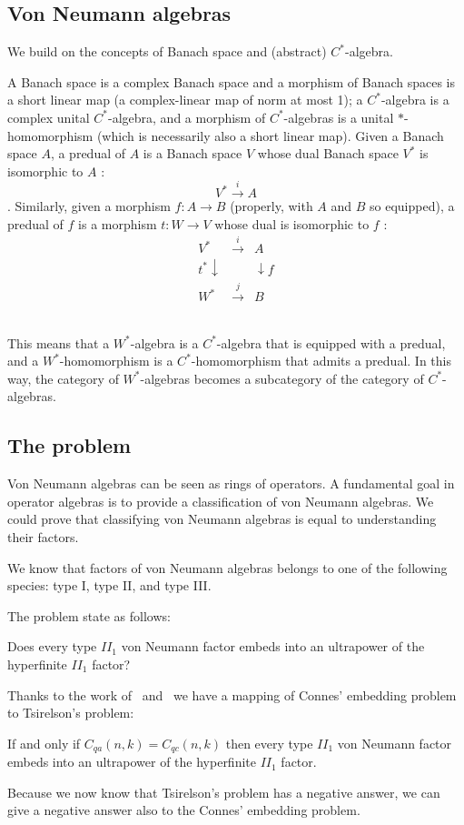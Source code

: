 
\subsection{Von Neumann algebras}
We build on the concepts of Banach space and (abstract) $C^{*}$-algebra. 

\begin{defn}
A Banach space is a complex Banach space and a morphism of Banach spaces is a short linear map (a complex-linear map of norm at most 1); a $C^{*}$-algebra is a complex unital $C^{*}$-algebra, and a morphism of $C^{*}$-algebras is a unital $*$-homomorphism (which is necessarily also a short linear map).
Given a Banach space $A$, a predual of $A$ is a Banach space $V$ whose dual Banach space $V^{*}$ is isomorphic to $A$ :
$$
V^{*} \stackrel{i}{\rightarrow} A
$$
. Similarly, given a morphism $f: A \rightarrow B$ (properly, with $A$ and $B$ so equipped), a predual of $f$ is a morphism $t: W \rightarrow V$ whose dual is isomorphic to $f$ :
$$
\begin{array}{ccc}
V^{*} & \stackrel{i}{\rightarrow} & A \\
t^{*} \downarrow & & \downarrow f \\
W^{*} & \stackrel{j}\rightarrow & B
\end{array}
$$
~\cite{vonNeuma44:online}
\end{defn}
This means that a $W^{*}$-algebra is a $C^{*}$-algebra that is equipped with a predual, and a $W^{*}$-homomorphism is a $C^{*}$-homomorphism that admits a predual. In this way, the category of $W^{*}$-algebras becomes a subcategory of the category of $C^{*}$-algebras.


\subsection{The problem}

Von Neumann algebras can be seen as rings of operators. A fundamental goal in operator algebras is to provide a classification of von Neumann algebras. We could prove that classifying von Neumann algebras is equal to understanding their factors.

We know that factors of von Neumann algebras belongs to one of the following species: type I, type II, and type III. 

The problem state as follows:

\begin{problem}
    Does every type $II_1$ von Neumann factor embeds into an ultrapower of the hyperfinite $II_1$ factor?~\cite{mipre}
\end{problem}

Thanks to the work of~\cite{Tsirelson_1} and~\cite{Tsirelson_2} we have a mapping of Connes' embedding problem to Tsirelson's problem:

\begin{theorem}
If and only if $C_{q a}(n, k) = C_{q c}(n, k)$ then every type $II_1$ von Neumann factor embeds into an ultrapower of the hyperfinite $II_1$ factor.~\cite{mipre}
\end{theorem}

Because we now know that Tsirelson's problem has a negative answer, we can give a negative answer also to the Connes' embedding problem.

